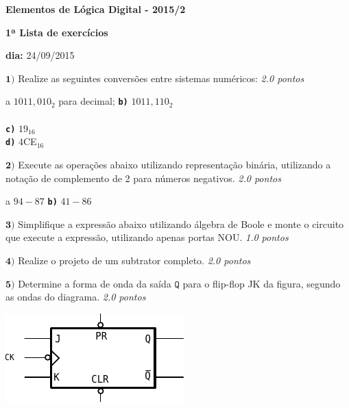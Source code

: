 \documentclass[12pt]{article}
\newcommand{\exerc}[3]{ \vspace{5pt} {$\mathbf{#1)}$} #2 \hfill {\it #3} }
\newcommand{\exitem}[2]{ \texttt{\bf #1)} #2 \\ }
\newenvironment{exitems}[1]{
\\
\hspace*{30pt}
\begin{minipage}{0.8\textwidth}
\begin{multicols}{#1} 
}{
\end{multicols}
\end{minipage}
}
\begin{document}

\begin{center}
{\Large \bf Elementos de Lógica Digital - 2015/2}
\end{center}

\vfill

{\large \bf 1ª Lista de exercícios}

{\bf dia:} 24/09/2015

\exerc{1}{Realize as seguintes conversões entre sistemas numéricos:}{2.0 pontos}
\begin{exitems}{2}
	\exitem{a}{ $1011,010_2$ para decimal;}
	\exitem{b}{ $1011,110_2$ }
	\\
	\exitem{c}{ $19_{16}$ }
	\exitem{d}{ $4$CE$_{16}$ }
\end{exitems}

\exerc{2}{Execute as operações abaixo utilizando representação binária, utilizando a notação de complemento de 2 para números negativos.}{2.0 pontos}
\begin{exitems}{2}
	\exitem{a}{ $94-87$}
	\exitem{b}{ $41-86$}
\end{exitems}

\exerc{3}{Simplifique a expressão abaixo utilizando álgebra de Boole e monte o circuito que execute a expressão, utilizando apenas portas NOU.}{1.0 pontos}

\exerc{4}{Realize o projeto de um subtrator completo.}{2.0 pontos}

\exerc{5}{Determine a forma de onda da saída $\mathtt{Q}$ para o flip-flop JK da figura, segundo as ondas do diagrama.}{2.0 pontos}
\\
\begin{multicols}{2}
\begin{center}
\includegraphics{fp-jk} \\ \vspace{15pt}
\end{center}
\end{multicols}
\end{document}
